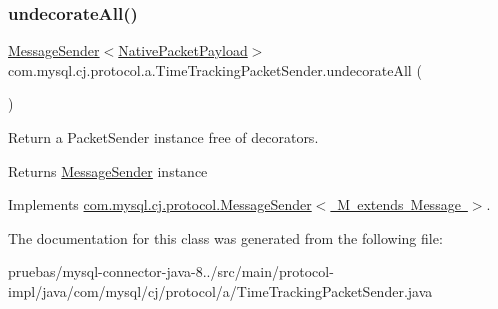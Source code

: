 \subsubsection{\texorpdfstring{undecorate\+All()}{undecorateAll()}}
{\footnotesize\ttfamily \mbox{\hyperlink{interfacecom_1_1mysql_1_1cj_1_1protocol_1_1_message_sender}{Message\+Sender}}$<$\mbox{\hyperlink{classcom_1_1mysql_1_1cj_1_1protocol_1_1a_1_1_native_packet_payload}{Native\+Packet\+Payload}}$>$ com.\+mysql.\+cj.\+protocol.\+a.\+Time\+Tracking\+Packet\+Sender.\+undecorate\+All (\begin{DoxyParamCaption}{ }\end{DoxyParamCaption})}

Return a Packet\+Sender instance free of decorators.

\begin{DoxyReturn}{Returns}
\mbox{\hyperlink{interfacecom_1_1mysql_1_1cj_1_1protocol_1_1_message_sender}{Message\+Sender}} instance 
\end{DoxyReturn}


Implements \mbox{\hyperlink{interfacecom_1_1mysql_1_1cj_1_1protocol_1_1_message_sender_a8066931f03c2fa9cc705716fa10a4517}{com.\+mysql.\+cj.\+protocol.\+Message\+Sender$<$ M extends Message $>$}}.



The documentation for this class was generated from the following file\+:\begin{DoxyCompactItemize}
\item 
pruebas/mysql-\/connector-\/java-\/8../src/main/protocol-\/impl/java/com/mysql/cj/protocol/a/Time\+Tracking\+Packet\+Sender.\+java\end{DoxyCompactItemize}
